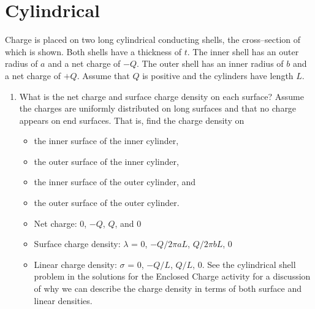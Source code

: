 \documentclass{article}
\begin{document}
\section{Cylindrical}

Charge is placed on two long cylindrical conducting shells, the cross--section of which is shown. Both shells have a thickness of $t$. The inner shell has an outer radius of $a$ and a net charge of $-Q$. The outer shell has an inner radius of $b$ and a net charge of $+Q$. Assume that $Q$ is positive and the cylinders have length $L$.



\begin{enumerate}

  \item What is the net charge and surface charge density on each surface? Assume the charges are uniformly distributed on long surfaces and that no charge appears on end surfaces. That is, find the charge density on

    \begin{itemize}

      \item the inner surface of the inner cylinder,

      \item the outer surface of the inner cylinder,

      \item the inner surface of the outer cylinder, and

      \item the outer surface of the outer cylinder.

    \end{itemize}

      \begin{itemize}

        \item Net charge: $0$, $-Q$, $Q$, and $0$

        \item Surface charge density: $\lambda$ = $0$, $-Q/2\pi a L$, $Q/2\pi b L$, $0$

        \item Linear charge density: $\sigma$ = $0$, $-Q/L$, $Q/L$, $0$. See the cylindrical shell problem in the solutions for the Enclosed Charge activity for a discussion of why we can describe the charge density in terms of both surface and linear densities.

      \end{itemize}

\end{enumerate}
\end{document}
